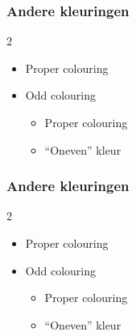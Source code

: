 \documentclass
[kulak] %
{kulakbeamer}
\begin{document}
	\begin{frame}
		\frametitle{Andere kleuringen}
		
		
		\begin{multicols}{2}
			
			\begin{itemize}
				\item Proper colouring
				\item Odd colouring
				\begin{itemize}
					\item Proper colouring
					\item ``Oneven'' kleur
				\end{itemize}
			\end{itemize}
			
			\vspace*{\fill}\null
			
			\pause
			\begin{center}
				\scalebox{.75}{}
			\end{center}
			
			
		\end{multicols}
		
		
	\end{frame}
	
	\begin{frame}
		\frametitle{Andere kleuringen}
		
		
		\begin{multicols}{2}
			
			\begin{itemize}
				\item Proper colouring
				\item Odd colouring
				\begin{itemize}
					\item Proper colouring
					\item ``Oneven'' kleur
				\end{itemize}
			\end{itemize}
			
			\vspace*{\fill}\null
			
			\begin{center}
				\scalebox{.75}{}
			\end{center}
			
			
		\end{multicols}
		
		
	\end{frame}
	
\end{document}
